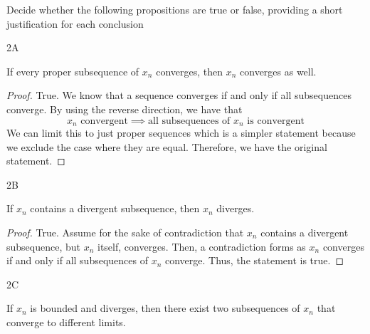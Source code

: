 \documentclass[boxes]{rutgers_hw}
\begin{document}
  \pagebreak


  \begin{exern}{2}

    Decide whether the following propositions are true or false, providing a short justification for each conclusion


    \begin{exern}{2A}

        If every proper subsequence of $x_n$ converges, then $x_n$ converges as well.
    
    \end{exern}

    \begin{proof}
        
        True. We know that a sequence converges if and only if all subsequences converge.
        By using the reverse direction, we have that
        \[ x_n \text{ convergent} \implies \text{all subsequences of } x_n \text{ is convergent}\]
        We can limit this to just proper sequences which is a simpler statement because we exclude the case where they are equal.
        Therefore, we have the original statement.

    \end{proof}


    \begin{exern}{2B}

        If $x_n$ contains a divergent subsequence, then $x_n$ diverges.
    
    \end{exern}

    \begin{proof}
        
        True. Assume for the sake of contradiction that $x_n$ contains a divergent subsequence, but $x_n$ itself, converges.
        Then, a contradiction forms as $x_n$ converges if and only if all subsequences of $x_n$ converge.
        Thus, the statement is true.

    \end{proof}


    \begin{exern}{2C}

        If $x_n$ is bounded and diverges, then there exist two subsequences of $x_n$ that converge to different limits.
    

\end{exern}
\end{exern}
\end{document}
